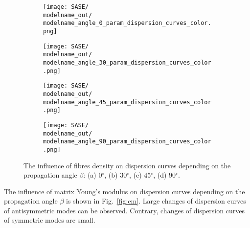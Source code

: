 \documentclass[preprint,12pt]{elsarticle}
\begin{document}
\begin{figure} [h!]
	\centering
	\newcommand{\modelname}{SASE3}
	\begin{subfigure}[b]{0.49\textwidth}
		\centering
		\texttt{[image: SASE/\\modelname\_out/\\modelname\_angle\_0\_param\_dispersion\_curves\_color.png]}
		\caption{}
		\label{fig:rhof0}
	\end{subfigure}
	\hfill
	\begin{subfigure}[b]{0.49\textwidth}
		\centering
		\texttt{[image: SASE/\\modelname\_out/\\modelname\_angle\_30\_param\_dispersion\_curves\_color.png]}
		\caption{}
		\label{fig:rhof30}
	\end{subfigure}
	\begin{subfigure}[b]{0.49\textwidth}
		\centering
		\texttt{[image: SASE/\\modelname\_out/\\modelname\_angle\_45\_param\_dispersion\_curves\_color.png]}
		\caption{}
		\label{fig:rhof45}
	\end{subfigure}
	\hfill
	\begin{subfigure}[b]{0.49\textwidth}
		\centering
		\texttt{[image: SASE/\\modelname\_out/\\modelname\_angle\_90\_param\_dispersion\_curves\_color.png]}
		\caption{}
		\label{fig:rhof90}
	\end{subfigure}
	\caption{The influence of fibres density on dispersion curves depending on the propagation angle $\beta$: (a) 0$^{\circ}$, (b) 30$^{\circ}$, (c) 45$^{\circ}$, (d) 90$^{\circ}$.} 
	\label{fig:rhof}
\end{figure}
\clearpage

The influence of matrix Young's modulus on dispersion curves depending on the propagation angle $\beta$ is shown in Fig.~\ref{fig:em}. Large changes of dispersion curves of antisymmetric modes can be observed. Contrary, changes of dispersion curves of symmetric modes are small.
\end{document}
